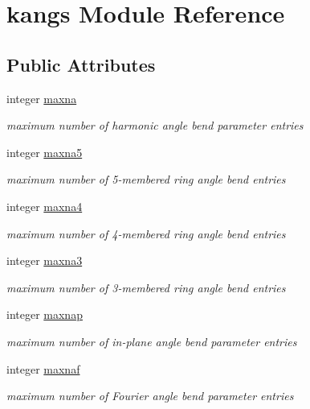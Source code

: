 \hypertarget{classkangs}{\section{kangs Module Reference}
\label{classkangs}
}
\subsection*{Public Attributes}
\begin{DoxyCompactItemize}
\item 
integer \hyperlink{classkangs_a219b9491df85352c42fb06b082f1fce2}{maxna}
\begin{DoxyCompactList}\small\item\em maximum number of harmonic angle bend parameter entries \end{DoxyCompactList}\item 
integer \hyperlink{classkangs_af188b59476d50504dd8aa39359285894}{maxna5}
\begin{DoxyCompactList}\small\item\em maximum number of 5-\/membered ring angle bend entries \end{DoxyCompactList}\item 
integer \hyperlink{classkangs_a65b59f16cd39d33f1686bf32e362e6c9}{maxna4}
\begin{DoxyCompactList}\small\item\em maximum number of 4-\/membered ring angle bend entries \end{DoxyCompactList}\item 
integer \hyperlink{classkangs_a121c0c19e92533f59e8c9b276e200da5}{maxna3}
\begin{DoxyCompactList}\small\item\em maximum number of 3-\/membered ring angle bend entries \end{DoxyCompactList}\item 
integer \hyperlink{classkangs_aaa36915cbec793691849f7f04c409e24}{maxnap}
\begin{DoxyCompactList}\small\item\em maximum number of in-\/plane angle bend parameter entries \end{DoxyCompactList}\item 
integer \hyperlink{classkangs_a3f749f34ae8245564a10206341a2dbdd}{maxnaf}
\begin{DoxyCompactList}\small\item\em maximum number of Fourier angle bend parameter entries \end{DoxyCompactList}\item 

\end{DoxyCompactItemize}
